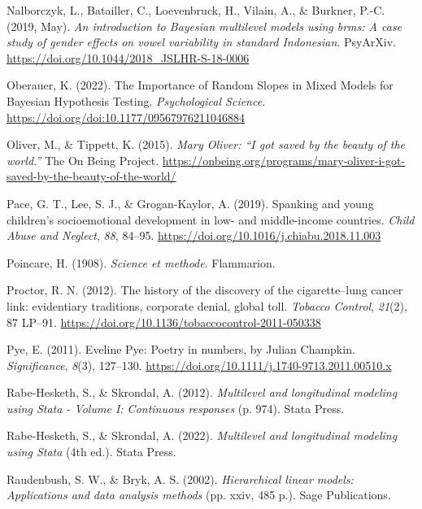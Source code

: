 \documentclass[
  letterpaper,
  DIV=11,
  numbers=noendperiod]{scrreprt}
\newlength{\cslhangindent}
\newenvironment{CSLReferences}[2] %
 {\begin{list}{}{%
  \setlength{\itemindent}{0pt}
  \setlength{\leftmargin}{0pt}
  \setlength{\parsep}{0pt}
  \ifodd #1
   \setlength{\leftmargin}{\cslhangindent}
   \setlength{\itemindent}{-1\cslhangindent}
  \fi
  \setlength{\itemsep}{#2\baselineskip}}}
 {\end{list}}
\begin{document}
\begin{CSLReferences}{1}{0}
Nalborczyk, L., Batailler, C., Loevenbruck, H., Vilain, A., \& Burkner,
P.-C. (2019, May). \emph{An introduction to {B}ayesian multilevel models
using brms: A case study of gender effects on vowel variability in
standard {I}ndonesian}. PsyArXiv.
\url{https://doi.org/10.1044/2018_JSLHR-S-18-0006}

Oberauer, K. (2022). {The Importance of Random Slopes in Mixed Models
for Bayesian Hypothesis Testing}. \emph{Psychological Science}.
\url{https://doi.org/doi:10.1177/09567976211046884}

Oliver, M., \& Tippett, K. (2015). \emph{{M}ary {O}liver: {``{I} got
saved by the beauty of the world.''}} The On Being Project.
\url{https://onbeing.org/programs/mary-oliver-i-got-saved-by-the-beauty-of-the-world/}

Pace, G. T., Lee, S. J., \& Grogan-Kaylor, A. (2019). {Spanking and
young children's socioemotional development in low- and middle-income
countries}. \emph{Child Abuse and Neglect}, \emph{88}, 84--95.
\url{https://doi.org/10.1016/j.chiabu.2018.11.003}

Poincare, H. (1908). \emph{Science et methode}. Flammarion.

Proctor, R. N. (2012). {The history of the discovery of the
cigarette--lung cancer link: evidentiary traditions, corporate denial,
global toll}. \emph{Tobacco Control}, \emph{21}(2), 87 LP--91.
\url{https://doi.org/10.1136/tobaccocontrol-2011-050338}

Pye, E. (2011). {E}veline {P}ye: Poetry in numbers, by {J}ulian
{C}hampkin. \emph{Significance}, \emph{8}(3), 127--130.
\url{https://doi.org/10.1111/j.1740-9713.2011.00510.x}

Rabe-Hesketh, S., \& Skrondal, A. (2012). \emph{Multilevel and
longitudinal modeling using {S}tata - {V}olume {I}: Continuous
responses} (p. 974). Stata Press.

Rabe-Hesketh, S., \& Skrondal, A. (2022). \emph{Multilevel and
longitudinal modeling using {S}tata} (4th ed.). Stata Press.

Raudenbush, S. W., \& Bryk, A. S. (2002). \emph{Hierarchical linear
models: Applications and data analysis methods} (pp. xxiv, 485 p.). Sage
Publications.


\end{CSLReferences}
\end{document}
